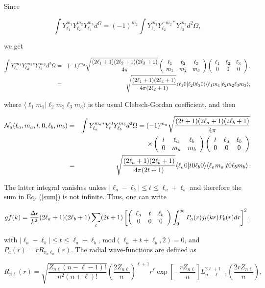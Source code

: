 \documentclass[a4paper,10pt]{article}
\begin{document}
\noindent Since

\begin{equation*}
\int Y_{\ell_1}^{m_1}Y_{\ell_2}^{m_2}Y_{\ell_3}^{m_3}d^\Omega=(-1)^{m_2}\int Y_{\ell_1}^{m_1}Y_{\ell_2}^{-m_2*} Y_{\ell_3}^{m_3}d^2\Omega,
\end{equation*}

\noindent we get

\begin{eqnarray*}
\int Y_{\ell_1}^{m_1}Y_{\ell_2}^{m_2*} Y_{\ell_3}^{m_3}d^2\Omega&=&(-1)^{m_2}\sqrt{\frac{(2\ell_1+1)(2\ell_2+1)(2\ell_3+1)}{4\pi}}\left(\begin{array}{ccc}\ell_1 & \ell_2 & \ell_3 \\ m_1 & m_2 & m_3 \end{array}\right)\left(\begin{array}{ccc}\ell_1 & \ell_2 & \ell_3 \\ 0 & 0 & 0 \end{array}\right).\nonumber\\
&=&\sqrt{\frac{(2\ell_1+1)(2\ell_3+1)}{4\pi (2\ell_2+1)}}\langle \ell_10|\ell_20\ell_30\rangle\langle\ell_1m_1|\ell_2m_2\ell_3m_3\rangle,
\end{eqnarray*}

\noindent where $\langle\ell_1m_1|\ell_2m_2\ell_3m_3\rangle$ is the usual Clebsch-Gordan coefficient, and then

\begin{eqnarray*}
\mathcal{N}_a(\ell_a,m_a,t,0,\ell_b,m_b)&=&\int Y_{\ell_a}^{m_a*}Y_{t}^0Y_{\ell_b}^{m_b}d^2\Omega=(-1)^{m_a}\sqrt{\frac{(2t+1)(2\ell_a+1)(2\ell_b+1)}{4\pi}}\nonumber\\
& &\times\left(\begin{array}{ccc}t & \ell_a & \ell_b \\ 0 & m_a & m_b \end{array}\right)\left(\begin{array}{ccc}t & \ell_a & \ell_b \\ 0 & 0 & 0 \end{array}\right)\nonumber\\
&=&\sqrt{\frac{(2\ell_a+1)(2\ell_b+1)}{4\pi (2t+1)}}\langle \ell_a0|t0\ell_b0\rangle\langle\ell_am_a|t0\ell_bm_b\rangle.
\end{eqnarray*}

\noindent The latter integral vanishes unless $|\ell_a-\ell_b|\leq t\leq\ell_a+\ell_b$ and therefore the sum in Eq. (\ref{sum}) is not infinite. Thus, one can write

\begin{equation*}
gf(k)=\frac{\Delta\epsilon}{k^2}(2\ell_a+1)(2\ell_b+1)\sum_t(2t+1)\left[\left(\begin{array}{ccc}\ell_a & t & \ell_b \\ 0 & 0 & 0 \end{array}\right)\int_0^{\infty}P_a(r)j_t(kr)P_b(r)dr\right]^2,
\end{equation*}

\noindent with $|\ell_a-\ell_b|\leq t\leq\ell_a+\ell_b$, $\mathrm{mod}(\ell_a+t+\ell_b,2)=0$, and $P_a(r)=rR_{n_a\ell_a}(r)$. The radial wave-functions are defined as

\begin{equation}\label{rn}
R_{n\ell}(r)=\sqrt{\frac{Z_{n\ell}(n-\ell-1)!}{n^2(n+\ell)!}}\left(\frac{2Z_{n\ell}}{n}\right)^{\ell+1}r^{\ell}\exp\left[-\frac{rZ_{n\ell}}{n}\right]L_{n-\ell-1}^{2\ell+1}\left(\frac{2rZ_{n\ell}}{n}\right),
\end{equation}
\end{document}

